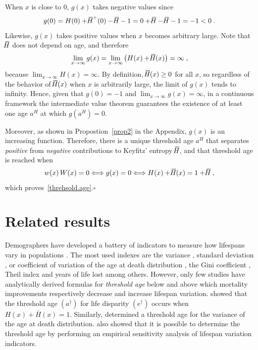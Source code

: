 \documentclass[a4paper,twoside, openright, 12pt, leqno]{article}
\newcommand*\xbar[1]{%
   \hbox{%
     \vbox{%
       \hrule height 0.5pt %
       \kern0.3ex%
       \hbox{%
         \kern-0.25em%
         \ensuremath{#1}%
         \kern-0.05em%
       }%
     }%
   }%
}
\begin{document}
When $x$ is close to 0, $g(x)$ takes negative values since
%
\begin{equation*}
g(0)=H(0)+\xbar{H}^+(0)-\xbar{H}-1=0+\xbar{H}-\xbar{H}-1=-1<0\;.
\end{equation*}
%
Likewise, $g(x)$ takes positive values when $x$ becomes arbitrary large. Note that $\xbar{H}$ does not depend on age, and therefore
%
$$
\lim_{x\to\infty}g(x)=\lim_{x\to\infty}\left(H(x)+\xbar{H}(x)\right)=\infty\;,
$$
%
because $\lim_{x\to\infty}H(x)=\infty$. By definition, $\xbar{H}(x)\geq0$ for all $x$, so regardless of the behavior of $\xbar{H}(x)$ when $x$ is arbitrarily large, the limit of $g(x)$ tends to infinity. Hence, given that $g(0)=-1$ and $\lim_{x\to\infty}g(x)=\infty$, in a continuous framework the intermediate value theorem guarantees the existence of at least one age $a^H$ at which $g(a^H)=0$.

Moreover, as shown in Propostion~\ref{prop2} in the Appendix, $g(x)$ is an increasing function. Therefore, there is a unique threshold age $a^H$ that separates \emph{positive} from \emph{negative} contributions to Keyfitz' entropy $\xbar{H}$, and that threshold age is reached when
%
\begin{equation*}
w(x)\,W(x)=0\Longleftrightarrow g(x)=0\Longleftrightarrow H(x)+ \xbar{H}(x)= 1+\xbar{H}\;,
\end{equation*}
%
which proves~\eqref{threhsold.age}.\hfill$\square$



\section{Related results}

Demographers have developed a battery of indicators to measure how lifespans vary in populations \citep{colchero2016emergence,vanRaalte2013}. The most used indexes are the variance \citep{edwards2005inequality, tuljapurkar2011variance}, standard deviation \citep{vanraalte2018Science}, or coefficient of variation \citep{aburto2018potential} of the age at death distribution , the Gini coefficient \citep{Shkolnikov2003,archer2018diet,gigliarano2017longevity}, Theil index \citep{Smits2009} and years of life lost \citep{Vaupel2011, Aburto2018Eastern} among others. However, only few studies have analytically derived formulas for \textit{threshold age} below and above which mortality improvements respectively decrease and increase lifespan variation. \citet{Zhang2009} showed that the threshold age $(a^\dagger)$ for life disparity $(e^\dagger)$ occurs when $H(x)+ \bar{H}(x)=1$. Similarly, \citet{Gillespie2014} determined a threshold age for the variance of the age at death distribution.  also showed that it is possible to determine the threshold age by performing an empirical sensitivity analysis of lifespan variation indicators.
\end{document}
